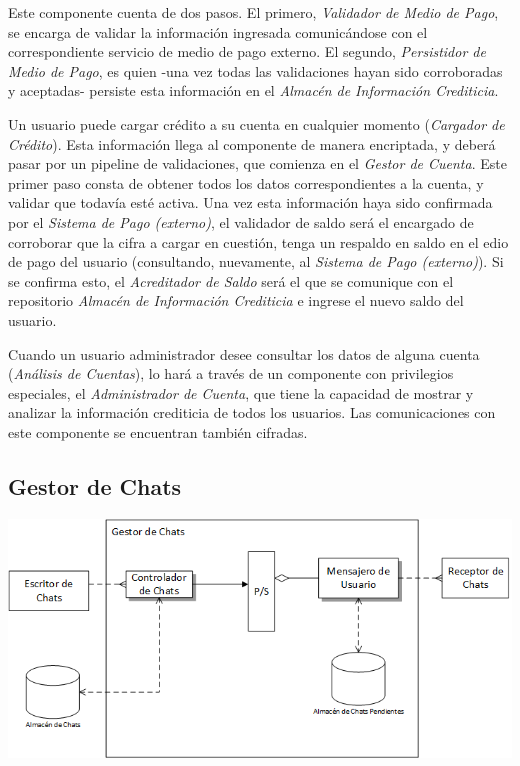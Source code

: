 Este componente cuenta de dos pasos. El primero, \emph{Validador de Medio de Pago}, se encarga de validar la información ingresada comunicándose con el correspondiente servicio de medio de pago externo. El segundo, \emph{Persistidor de Medio de Pago}, es quien -una vez todas las validaciones hayan sido corroboradas y aceptadas- persiste esta información en el \emph{Almacén de Información Crediticia}.

Un usuario puede cargar crédito a su cuenta en cualquier momento (\emph{Cargador de Crédito}). Esta información llega al componente de manera encriptada, y deberá pasar por un pipeline de validaciones, que comienza en el \emph{Gestor de Cuenta}. Este primer paso consta de obtener todos los datos correspondientes a la cuenta, y validar que todavía esté activa. Una vez esta información haya sido confirmada por el \emph{Sistema de Pago (externo)}, el validador de saldo será el encargado de corroborar que la cifra a cargar en cuestión, tenga un respaldo en saldo en el edio de pago del usuario (consultando, nuevamente, al \emph{Sistema de Pago (externo)}). Si se confirma esto, el \emph{Acreditador de Saldo} será el que se comunique con el repositorio \emph{Almacén de Información Crediticia} e ingrese el nuevo saldo del usuario.

Cuando un usuario administrador desee consultar los datos de alguna cuenta (\emph{Análisis de Cuentas}), lo hará a través de un componente con privilegios especiales, el \emph{Administrador de Cuenta}, que tiene la capacidad de mostrar y analizar la información crediticia de todos los usuarios. Las comunicaciones con este componente se encuentran también cifradas.

\newpage
\subsection{Gestor de Chats}
\begin{center}
\includegraphics[scale=0.80]{diagramas/gestor_de_chats}
\label{fig:gestor_de_chats}
\end{center}

